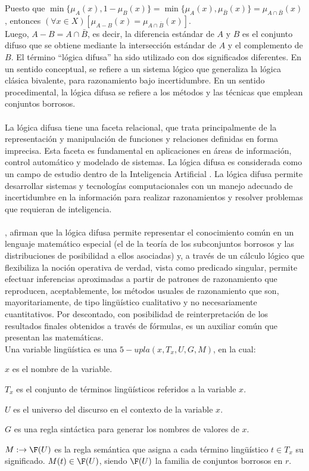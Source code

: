 Puesto que $\min \{\mu_{A}(x), 1 - \mu_{B}(x)\} = \min \{\mu_{A}(x), \mu_{\bar{B}}(x)\} =\mu_{A \cap \bar{B} }(x)$, entonces $(\forall x \in X)[\mu_{A - B }(x) = \mu_{A \cap \bar{B} }(x)]$.
\\
Luego, $A - B = A \cap \bar{B}$, es decir, la diferencia estándar de $A$ y $B$ es el conjunto difuso que se obtiene mediante la intersección estándar de $A$ y el complemento de $B$.
El término ``lógica difusa'' ha sido utilizado con dos significados diferentes. En un sentido conceptual, se refiere a un sistema lógico que generaliza la lógica clásica bivalente, para razonamiento bajo incertidumbre. En un sentido procedimental, la lógica difusa se refiere a los métodos y las técnicas que emplean conjuntos borrosos.\\
\\
La lógica difusa tiene una faceta relacional, que trata principalmente de la
representación y manipulación de funciones y relaciones definidas en forma
imprecisa. Esta faceta es fundamental en aplicaciones en áreas de información, control automático y modelado de sistemas. La lógica difusa es considerada como un campo de estudio dentro de la Inteligencia Artificial \cite[]{yen1999fuzzy}. La lógica difusa permite desarrollar sistemas y tecnologías computacionales con un manejo adecuado de incertidumbre en la información para realizar razonamientos y resolver problemas que requieran de inteligencia.\\
\\
\citet{trillas1992aplicaciones},  afirman que la lógica difusa permite representar el conocimiento común en un lenguaje matemático especial (el de la teoría de los subconjuntos borrosos y las distribuciones de posibilidad a ellos asociadas) y, a través de un cálculo lógico que flexibiliza la noción operativa de verdad, vista como predicado singular, permite efectuar inferencias aproximadas a partir de patrones de razonamiento que reproducen, aceptablemente, los métodos usuales de razonamiento que son, mayoritariamente, de tipo lingüístico cualitativo y no necesariamente cuantitativos. Por descontado, con posibilidad de reinterpretación de los resultados finales obtenidos a través de fórmulas, es un auxiliar común que presentan las matemáticas.\\
Una variable lingüística \cite[]{zadeh1975concept} es una $5-upla(x, T_{x}, U, G, M)$, en la cual:
\begin{viñetas}
\item $x$ es el nombre de la variable.
\item $T_{x}$ es el conjunto de términos lingüísticos referidos a la variable $x$.
\item $U$ es el universo del discurso en el contexto de la variable $x$.
\item $G$ es una regla sintáctica para generar los nombres de valores de $x$. 
\item $M: \rightarrow \F (U)$ es la regla semántica que asigna a cada término lingüístico $t \in T_{x}$ su significado. $M(t) \in \F (U)$, siendo $\F (U)$ la familia de conjuntos borrosos en $r$.
\end{viñetas}

